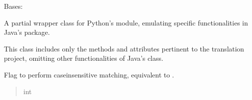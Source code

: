 \documentclass[letterpaper,10pt,english]{sphinxmanual}
\begin{document}
\begin{fulllineitems}
\label{\detokenize{apache_commons_validator_python.util:apache_commons_validator_python.util.regex.Regex}}
\pysigstartsignatures
{}
\pysigstopsignatures
\sphinxAtStartPar
Bases: 

\sphinxAtStartPar
A partial wrapper class for Python’s  module, emulating specific
functionalities in Java’s  package.

\sphinxAtStartPar
This class includes only the methods and attributes pertinent to the translation project,
omitting other functionalities of Java’s  class.

\begin{fulllineitems}
\label{\detokenize{apache_commons_validator_python.util:apache_commons_validator_python.util.regex.Regex.CASE_INSENSITIVE}}
\pysigstartsignatures
{}
\pysigstopsignatures
\sphinxAtStartPar
Flag to perform case\sphinxhyphen{}insensitive matching, equivalent to .
\begin{quote}\begin{description}
\sphinxAtStartPar
int

\end{description}\end{quote}

\end{fulllineitems}


\begin{fulllineitems}
\label{\detokenize{apache_commons_validator_python.util:id4}}
\pysigstartsignatures
{}
\pysigstopsignatures
\end{fulllineitems}


\end{fulllineitems}
\end{document}
